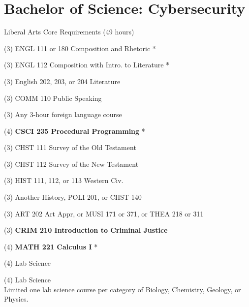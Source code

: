 %
\section*{Bachelor of Science: Cybersecurity}

\begin{reqgroup}{Liberal Arts Core Requirements (49 hours)}
\begin{checklist}
\begin{minipage}[t]{0.5\linewidth}
	\item (3) ENGL 111 or 180 Composition and Rhetoric *
	\item (3) ENGL 112 Composition with Intro\@. to Literature *
	\item (3) English 202, 203, or 204 Literature
	\item (3) COMM 110 Public Speaking
	\item (3) Any 3-hour foreign language course
	\item (4) \textbf{CSCI 235  Procedural Programming} *
	\item (3) CHST 111  Survey of the Old Testament
	\item (3) CHST 112  Survey of the New Testament
	\item (3) HIST 111, 112, or 113 Western Civ.
\end{minipage}
\begin{minipage}[t]{0.5\linewidth}
	\item (3) Another History, POLI 201, or CHST 140
	\item (3) ART 202 Art Appr, or MUSI 171 or 371, or THEA 218 or 311
	\item (3) \textbf{CRIM 210 Introduction to Criminal Justice}
	\item (4) \textbf{MATH 221 Calculus I} *
	\item (4) Lab Science
	\item (4) Lab Science\\Limited one lab science course per category of Biology, Chemistry,
Geology, or Physics.
\end{minipage}
\end{checklist}
\end{reqgroup}


